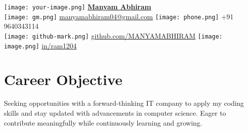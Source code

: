 \documentclass{article}
\begin{document}
\pagestyle{empty}
\begin{paracol}{2} %

\hspace{-5mm}
\texttt{[image: your-image.png]} %
\switchcolumn %
\vspace*{2mm}
\hspace{-4mm}
{\fontsize{11}{11}\selectfont \href{https://manyamabhiram.github.io/Portfolio/}{\fontsize{35}{35}\selectfont \textbf{Manyam Abhiram}}}\\[2mm]
\vspace{3mm}
\hspace{2mm}
\texttt{[image: gm.png]} 
{\fontsize{11}{11}\selectfont \href{mailto:manyamabhiram04@gmail.com}{manyamabhiram04@gmail.com}}
\hspace{13.5mm}
\texttt{[image: phone.png]}
{\fontsize{11}{11}\selectfont +91 9640343114}\\
\vspace{2mm}
\hspace{0.5mm}
\texttt{[image: github-mark.png]} 
{\fontsize{11}{11}\selectfont \href{https://www.github.com/MANYAMABHIRAM}{github.com/MANYAMABHIRAM}}
\hspace{8mm}
\texttt{[image: image.png]} 
{\fontsize{11}{11}\selectfont \href{https://www.linkedin.com/in/ram1204}{in/ram1204}}

\end{paracol}

\vspace{2mm}
\noindent
\hline
\vspace{-6mm}
\hspace{-7mm}
\section*{Career Objective}
\vspace{-2mm}
\begin{justify}
Seeking opportunities with a forward-thinking IT company to apply my coding skills and stay updated with advancements in computer science. Eager to contribute meaningfully while continuously learning and growing.\end{justify}
\hline
\vspace{-3mm}
\end{document}
